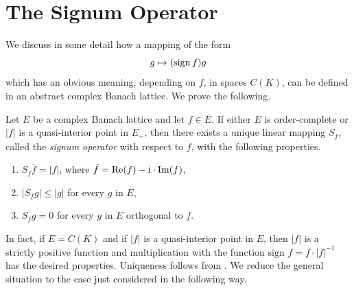 \section{The Signum Operator}\label{sec:c1-8}%
We discuss in some detail how a mapping of the form
\[
g \mapsto (\operatorname{sign} f )g
\]
which has an obvious meaning, depending on $ f $, in spaces $ C(K) $, can be defined in an abstract complex Banach lattice.
We prove the following.
\begin{proposition*}
Let $ E $ be a complex Banach lattice and let $ f \in E $.
If either $ E $ is order-complete or $ |f| $ is a quasi-interior point in $ E_{+} $, then there exists a unique linear mapping $ S_{f} $, called the \emph{signum operator} with respect to $ f $, with the following properties.
\begin{enumerate}[\upshape (i)]

\item  
$ S_{f}\bar{f} = |f| $, where $ \bar{f} = \mathop{}\!\mathrm{Re}(f) -  \mathrm{i} \cdot\mathop{}\!\mathrm{Im}(f) $,

\item 
$ |S_{f}g| \leq |g| $ for every $ g $ in $ E $,

\item 
$ S_{f}g = 0 $ for every $ g $ in $ E $ orthogonal to $ f $.
\end{enumerate}
\end{proposition*}
In fact, if\/ $ E = C(K) $ and if\/ $ |f| $ is a quasi-interior point in $ E $, then $ |f| $ is a strictly positive function and multiplication with the function $ \text{sign } f = f\cdot|f|^{-1} $ has the desired properties.
Uniqueness follows from \textcite[Chap. 20]{zaanen:1983}.
We reduce the general situation to the case just considered in the following way.
